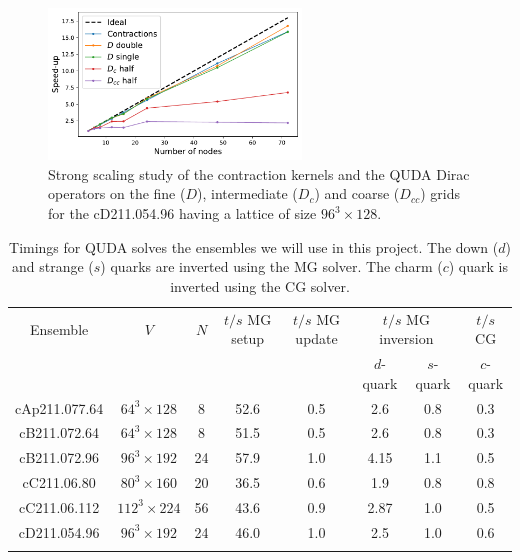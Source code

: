 \begin{figure}
	\includegraphics[width=0.6\textwidth]{plots/speedup.pdf}
	\caption{Strong scaling study of the contraction kernels and the QUDA Dirac operators on the fine ($D$), intermediate ($D_c$) and coarse ($D_{cc}$) grids for the cD211.054.96 having a lattice of size $96^3\times128$.}
	\label{fig:quda_dirac_strong}
\end{figure}

\begin{table}%
	\centering %
	\begin{tabular}{cccccccc} %
		\toprule
		Ensemble & $V$ & $N$ & $t/s$ MG setup & $t/s$ MG update& \multicolumn{2}{c}{$t/s$ MG inversion}& $t/s$ CG\\
		& & & & & $d$-quark & $s$-quark& $c$-quark\\
		\midrule
		cAp211.077.64 & $64^3\times128$ & 8  & 52.6 & 0.5  & 2.6  & 0.8 & 0.3\\
		\midrule
		cB211.072.64 & $64^3\times128$  & 8  & 51.5 & 0.5  & 2.6  & 0.8 & 0.3\\
		cB211.072.96 & $96^3\times192$  & 24 & 57.9 & 1.0  & 4.15 & 1.1 & 0.5\\
		\midrule
		cC211.06.80 & $80^3\times160$   & 20 &36.5  & 0.6  & 1.9  & 0.8 & 0.8\\
		cC211.06.112 & $112^3\times224$ & 56 & 43.6 & 0.9 & 2.87 & 1.0 & 0.5 \\
		\midrule
		cD211.054.96 & $96^3\times192$  & 24 & 46.0 & 1.0  & 2.5  & 1.0 & 0.6\\
		\bottomrule& 
	\end{tabular}
  \caption{Timings for QUDA solves the ensembles we will use in this project.  
  	The down ($d$) and strange ($s$) quarks are inverted using the MG solver.
  	The charm ($c$) quark is inverted using the CG solver.
    }
  \label{tab:MGsolver}
\end{table}

